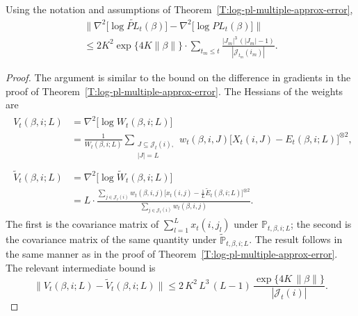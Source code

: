 \documentclass[final]{statsoc}
\newcommand{\qedhere}{}
\begin{document}
\begin{lemma}\label{L:hessian-approx-bound}
Using the notation and assumptions of
Theorem~\ref{T:log-pl-multiple-approx-error},
\begin{multline*}
    \Big\|
        \nabla^2\big[ \log \widetilde{\mathit{PL}}_t(\beta) \big]
        -
        \nabla^2\big[ \log \mathit{PL}_t(\beta) \big]
    \Big\| \\
        \leq
            2K^2
            \exp\{4 K \| \beta \|\}
            \cdot
            \sum_{t_m \leq t}
                \frac{|J_m|^3 \, (|J_m| - 1)}{|\mathcal{J}_{t_m}(i_m)|}.
\end{multline*}
\end{lemma}
\begin{proof}
The argument is similar to the bound on the difference in gradients in
the proof of Theorem~\ref{T:log-pl-multiple-approx-error}.  The Hessians of
the weights are
\begin{align}
    \begin{split}
    V_t(\beta,i;L)
        &=
        \nabla^2 \big[  \log W_t(\beta, i; L) \big] \\
        &=
        \frac{1}{W_t(\beta,i;L)}
        \sum_{\substack{J \subseteq \mathcal{J}_t(i), \\
                        |J| = L}}
            w_t(\beta,i,J)
            \Big[
                X_t(i,J)
                -
                E_t(\beta,i;L)
            \Big]^{\otimes 2},
    \end{split} \\
    \begin{split}
    \widetilde V_t(\beta,i;L)
        &=
        \nabla^2 \big[ \log \widetilde W_t(\beta,i;L) \big] \\
        &=
        L
        \cdot
        \frac{
            \sum_{j \in \mathcal{J}_t(i)}
                w_t(\beta, i, j)
                \Big[ x_t(i,j) - \tfrac{1}{L} \widetilde E_t(\beta,i;L) \Big]^{\otimes 2}
        }{
            \sum_{j \in \mathcal{J}_t(i)}
                w_t(\beta, i, j)
        }.
    \end{split}
\end{align}
The first is the covariance matrix of $\sum_{l=1}^L x_t(i,j_l)$ under
$\mathbb{P}_{t,\beta,i;L}$; the second is the covariance matrix of the same
quantity under $\tilde{\mathbb{P}}_{t,\beta,i;L}$.
The result follows in the same manner as in the proof of
Theorem~\ref{T:log-pl-multiple-approx-error}.
The relevant intermediate bound is
\[
    \Big\| V_{t}(\beta, i; L) - \widetilde{V}_t(\beta, i; L) \Big\|
        \leq
        2\, K^2 \, L^3 \, (L - 1)
        \,
        \frac{\exp\{4 K \, \| \beta \|\}}{| \mathcal{J}_t(i) |}.
    \qedhere
\]
\end{proof}
\end{document}
